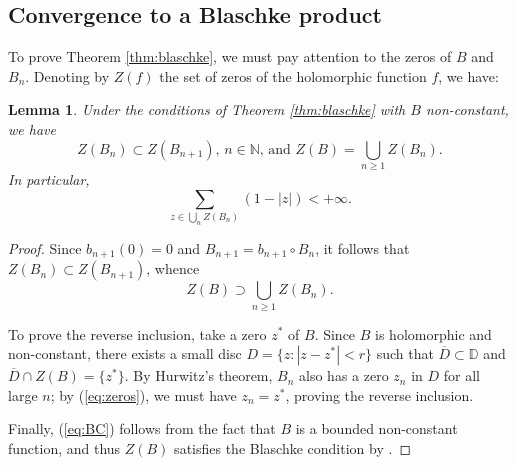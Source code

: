 \documentclass[a4paper,11pt]{article}
\theoremstyle{plain}
\newtheorem{lemma}{Lemma}[section]
\theoremstyle{definition}
\theoremstyle{definition}
\def\D{\mathbb{D}}
\begin{document}
\subsection{Convergence to a Blaschke product}
To prove Theorem \ref{thm:blaschke}, we must pay attention to the zeros of $B$ and $B_n$. Denoting by $Z(f)$ the set of zeros of the holomorphic function $f$, we have:
\begin{lemma} \label{lem:zeros}
Under the conditions of Theorem \ref{thm:blaschke} with $B$ non-constant, we have
\begin{equation*}
    \text{$Z(B_n)\subset Z(B_{n+1})$, $n\in\mathbb{N}$, and $Z(B) = \bigcup_{n\geq 1} Z(B_n)$.}
\end{equation*}
In particular,
\begin{equation} \label{eq:BC}
    \sum_{z\in\bigcup_n Z(B_n)} (1 - |z|) < +\infty.
\end{equation}
\end{lemma}
\begin{proof}
Since $b_{n+1}(0) = 0$ and $B_{n+1} = b_{n+1}\circ B_n$, it follows that $Z(B_n)\subset Z(B_{n+1})$, whence
\begin{equation} \label{eq:zeros}
    Z(B)\supset \bigcup_{n\geq 1} Z(B_n).
\end{equation}

To prove the reverse inclusion, take a zero $z^*$ of $B$. Since $B$ is holomorphic and non-constant, there exists a small disc $D = \{z : |z - z^*| < r\}$ such that $\overline{D}\subset\D$ and $\overline{D}\cap Z(B) = \{z^*\}$. By Hurwitz's theorem, $B_n$ also has a zero $z_n$ in $D$ for all large $n$; by (\ref{eq:zeros}), we must have $z_n = z^*$, proving the reverse inclusion.

Finally, (\ref{eq:BC}) follows from the fact that $B$ is a bounded non-constant function, and thus $Z(B)$ satisfies the Blaschke condition by \cite[Theorem 2.3]{Dur70}.
\end{proof}
\end{document}
